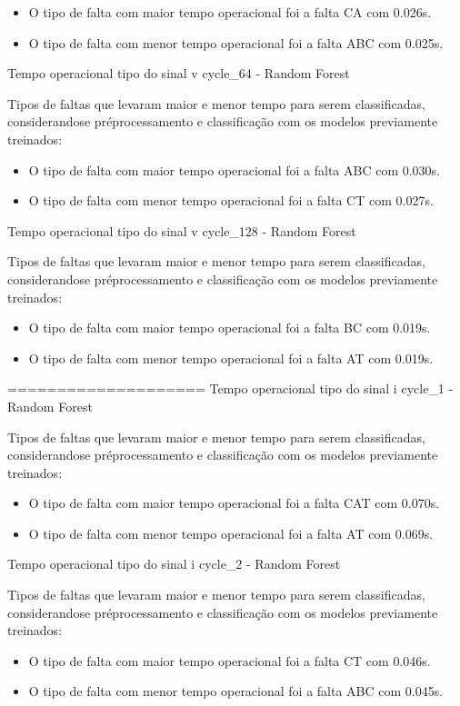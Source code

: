 \begin{itemize}
\item O tipo de falta com maior tempo operacional foi a falta CA com 0.026s.
\item O tipo de falta com menor tempo operacional foi a falta ABC com 0.025s.
\end{itemize}
Tempo operacional tipo do sinal v cycle_64 - Random Forest
\item Tipos de faltas que levaram maior e menor tempo para serem classificadas, considerando\hyph se pré\hyph processamento e classificação com os modelos previamente treinados:
\begin{itemize}
\item O tipo de falta com maior tempo operacional foi a falta ABC com 0.030s.
\item O tipo de falta com menor tempo operacional foi a falta CT com 0.027s.
\end{itemize}
Tempo operacional tipo do sinal v cycle_128 - Random Forest
\item Tipos de faltas que levaram maior e menor tempo para serem classificadas, considerando\hyph se pré\hyph processamento e classificação com os modelos previamente treinados:
\begin{itemize}
\item O tipo de falta com maior tempo operacional foi a falta BC com 0.019s.
\item O tipo de falta com menor tempo operacional foi a falta AT com 0.019s.
\end{itemize}
====================
Tempo operacional tipo do sinal i cycle_1 - Random Forest
\item Tipos de faltas que levaram maior e menor tempo para serem classificadas, considerando\hyph se pré\hyph processamento e classificação com os modelos previamente treinados:
\begin{itemize}
\item O tipo de falta com maior tempo operacional foi a falta CAT com 0.070s.
\item O tipo de falta com menor tempo operacional foi a falta AT com 0.069s.
\end{itemize}
Tempo operacional tipo do sinal i cycle_2 - Random Forest
\item Tipos de faltas que levaram maior e menor tempo para serem classificadas, considerando\hyph se pré\hyph processamento e classificação com os modelos previamente treinados:
\begin{itemize}
\item O tipo de falta com maior tempo operacional foi a falta CT com 0.046s.
\item O tipo de falta com menor tempo operacional foi a falta ABC com 0.045s.
\end{itemize}
